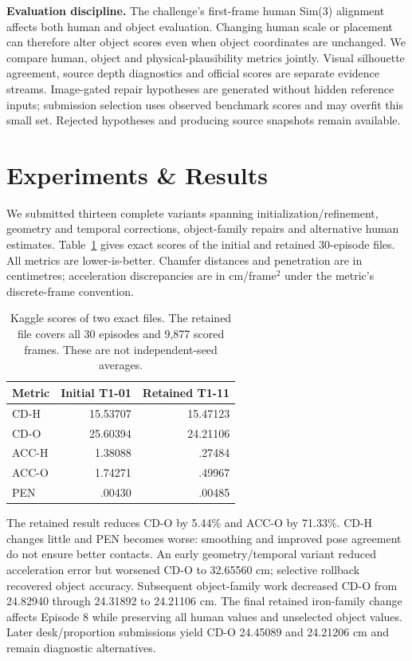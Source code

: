 \documentclass[10pt]{nvidiaextabstract}
\begin{document}
\textbf{Evaluation discipline.}
The challenge's first-frame human Sim(3) alignment affects both human and
object evaluation. Changing human scale or placement can therefore alter
object scores even when object coordinates are unchanged. We compare human,
object and physical-plausibility metrics jointly. Visual silhouette agreement,
source depth diagnostics and official scores are separate evidence streams.
Image-gated repair hypotheses are generated without hidden reference inputs;
submission selection uses observed benchmark scores and may overfit this small
set. Rejected hypotheses and producing source snapshots remain available.

\section{Experiments \& Results}
We submitted thirteen complete variants spanning initialization/refinement,
geometry and temporal corrections, object-family repairs and alternative
human estimates. Table~\ref{tab:results} gives exact scores of the initial and
retained 30-episode files. All metrics are lower-is-better. Chamfer distances
and penetration are in centimetres; acceleration discrepancies are in
cm/frame$^2$ under the metric's discrete-frame convention.

\begin{table}[t]
\centering\small\setlength{\tabcolsep}{4pt}
\begin{tabular}{lrr}
\toprule
Metric & Initial T1-01 & Retained T1-11\\
\midrule
CD-H & 15.53707 & 15.47123\\
CD-O & 25.60394 & 24.21106\\
ACC-H & 1.38088 & .27484\\
ACC-O & 1.74271 & .49967\\
PEN & .00430 & .00485\\
\bottomrule
\end{tabular}
\caption{Kaggle scores of two exact files. The retained file covers all 30
episodes and 9,877 scored frames. These are not independent-seed averages.}
\label{tab:results}
\end{table}

The retained result reduces CD-O by 5.44\% and ACC-O by 71.33\%.
CD-H changes little and PEN becomes worse: smoothing and improved pose
agreement do not ensure better contacts. An early geometry/temporal variant
reduced acceleration error but worsened CD-O to 32.65560 cm; selective
rollback recovered object accuracy. Subsequent object-family work decreased
CD-O from 24.82940 through 24.31892 to 24.21106 cm. The final retained
iron-family change affects Episode 8 while preserving all human values and
unselected object values. Later desk/proportion submissions yield CD-O
24.45089 and 24.21206 cm and remain diagnostic alternatives.
\end{document}
